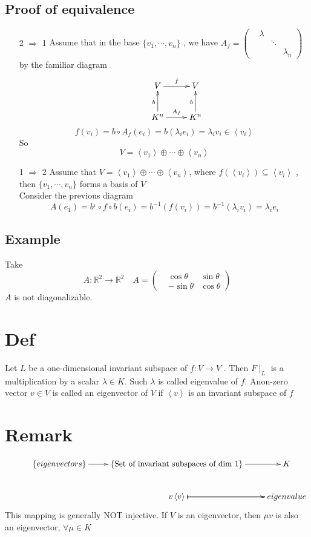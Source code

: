 \documentclass{book}
\begin{document}
\subsection*{Proof of equivalence}
\begin{itemize}
    \item [2 $\Rightarrow$ 1]Assume that in the base $\{v_1,\cdots,v_n\}$ , we have $A_f=\left(\begin{aligned}
        &\lambda&&\\ &&\ddots&\\ &&&\lambda_n\end{aligned}\right)$ by the familiar diagram
        $$\xymatrix{&V\ar[r]^f &V\\ &K^n\ar[u]^b\ar[r]^{A_f} &K^n\ar[u]^b}$$$$f(v_i)=b\circ A_f(e_i)=b(\lambda_ie_i)=\lambda_iv_i\in\left<v_i\right>$$
        So $$V=\left<v_1\right>\oplus\cdots\oplus\left<v_n\right>$$
    \item [1 $\Rightarrow$ 2]Assume that $V=\left<v_1\right>\oplus\cdots\oplus\left<v_n\right>$, where $f(\left<v_i\right>)\subseteq\left<v_i\right>$
    , then $\{v_1,\cdots,v_n\}$ forms a basis of $V$\\
    Consider the previous diagram
    $$A(e_1)=b^{_1}\circ f\circ b(e_i)=b^{-1}(f(v_i))=b^{-1}(\lambda_iv_i)=\lambda_ie_i$$
\end{itemize}
\subsection{Example}
Take $$A:\mathbb{R}^2\rightarrow\mathbb{R}^2\quad A=\left(\begin{aligned}&\cos\theta &\sin\theta\\ &-\sin\theta&\cos\theta\end{aligned}\right)$$ $A$ is not diagonalizable.
\section{Def}
Let $L$ be a one-dimensional invariant subspace of $f:V\rightarrow V$ . Then $F\mid_L$ is a multiplication by a scalar $\lambda\in K$. Such $\lambda$ is called eigenvalue of $f$. Anon-zero vector $v\in V$ is called an eigenvector of $V$ if $\left<v\right>$ is an invariant subspace of $f$
\section{Remark}
$$\xymatrix{ &\{eigenvectors\}\ar[r]&\{\text{Set of invariant subspaces of dim 1}\}\ar[r] &K\\
&&v\ar@{|->}[r]\left<v\right>\ar@{|->}[r]&eigenvalue
}$$
This mapping is generally NOT injective. If $V$ is an eigenvector, then $\mu v$ is also an eigenvector, $\forall \mu\in K$
\end{document}
